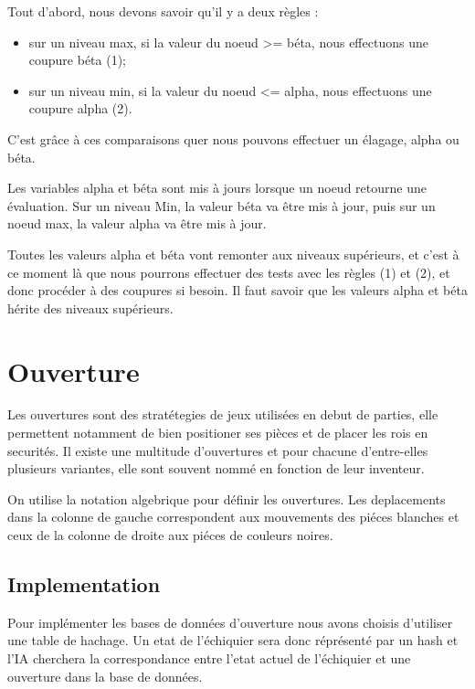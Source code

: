 \documentclass[12pt]{article}
\begin{document}
Tout d'abord, nous devons savoir qu'il y a deux règles :

\begin{itemize}
\itemsep1pt\parskip0pt
\item
  sur un niveau max, si la valeur du noeud \textgreater{}= béta, nous
  effectuons une coupure béta (1);
\item
  sur un niveau min, si la valeur du noeud \textless{}= alpha, nous
  effectuons une coupure alpha (2).
\end{itemize}

C'est grâce à ces comparaisons quer nous pouvons effectuer un élagage,
alpha ou béta.

Les variables alpha et béta sont mis à jours lorsque un noeud retourne
une évaluation. Sur un niveau Min, la valeur béta va être mis à jour,
puis sur un noeud max, la valeur alpha va être mis à jour.

Toutes les valeurs alpha et béta vont remonter aux niveaux supérieurs,
et c'est à ce moment là que nous pourrons effectuer des tests avec les
règles (1) et (2), et donc procéder à des coupures si besoin. Il faut
savoir que les valeurs alpha et béta hérite des niveaux supérieurs.

\section{Ouverture}\label{ouverture}

Les ouvertures sont des stratétegies de jeux utilisées en debut de
parties, elle permettent notamment de bien positioner ses pièces et de
placer les rois en securités. Il existe une multitude d'ouvertures et
pour chacune d'entre-elles plusieurs variantes, elle sont souvent nommé
en fonction de leur inventeur.

On utilise la notation algebrique pour définir les ouvertures. Les
deplacements dans la colonne de gauche correspondent aux mouvements des
piéces blanches et ceux de la colonne de droite aux piéces de couleurs
noires.

\subsection{Implementation}\label{implementation}

Pour implémenter les bases de données d'ouverture nous avons choisis
d'utiliser une table de hachage. Un etat de l'échiquier sera donc
réprésenté par un hash et l'IA cherchera la correspondance entre l'etat
actuel de l'échiquier et une ouverture dans la base de données.
\end{document}
